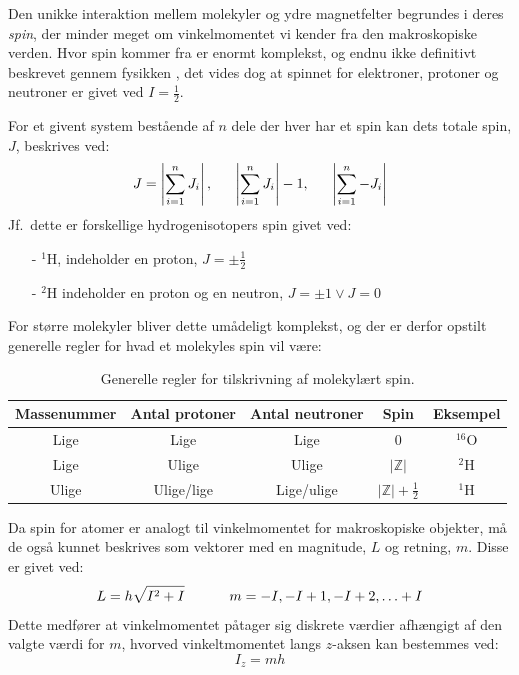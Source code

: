     Den unikke interaktion mellem molekyler og ydre magnetfelter begrundes i deres \textit{spin}, der minder meget om vinkelmomentet vi kender fra den makroskopiske verden. Hvor spin kommer fra er enormt komplekst, og endnu ikke definitivt beskrevet gennem fysikken \parencite{Edwi2015}, det vides dog at spinnet for elektroner, protoner og neutroner er givet ved $I=\frac{1}{2}$.

    For et givent system bestående af $n$ dele der hver har et spin kan dets totale spin, $J$, beskrives ved:
    \[
        J=\left|\sum_{i=1}^n J_i\right|, \hskip 16pt \left|\sum_{i=1}^n J_i\right|-1, \hskip 16pt \left|\sum_{i=1}^n -J_i\right|
    \]
    Jf.\ dette er forskellige hydrogenisotopers spin givet ved:
    \begin{itemize}
        \item[-] $^1$H, indeholder en proton, $J=\pm\frac{1}{2}$ 
        \item[-] $^2$H indeholder en proton og en neutron, $J=\pm 1 \vee J=0$ 
    \end{itemize}
    For større molekyler bliver dette umådeligt komplekst, og der er derfor opstilt generelle regler for hvad et molekyles spin vil være:
    \begin{table}[H]\centering
        \caption{Generelle regler for tilskrivning af molekylært spin.}
        \begin{tabular}{ccccc}
            \toprule
            Massenummer & Antal protoner & Antal neutroner & Spin & Eksempel \\
            \midrule
            Lige & Lige & Lige & $0$ & $^{16}$O \\
            Lige & Ulige & Ulige & $\left|\mathbb{Z}\right|$ & $^2$H \\
            Ulige & Ulige/lige & Lige/ulige &  $\left|\mathbb{Z}\right|+\frac{1}{2}$ & $^1$H \\
            \bottomrule
        \end{tabular}
    \end{table}
    Da spin for atomer er analogt til vinkelmomentet for makroskopiske objekter, må de også kunnet beskrives som vektorer med en magnitude, $L$ og retning, $m$. Disse er givet ved:
    \[
        L=h\sqrt{I^2+I} \hskip 32pt m=-I,-I+1,-I+2,\ldots+I
    \]
    Dette medfører at vinkelmomentet påtager sig diskrete værdier afhængigt af den valgte værdi for $m$, hvorved vinkeltmomentet langs $z$-aksen kan bestemmes ved:
    \[
        I_z=mh
    \]
